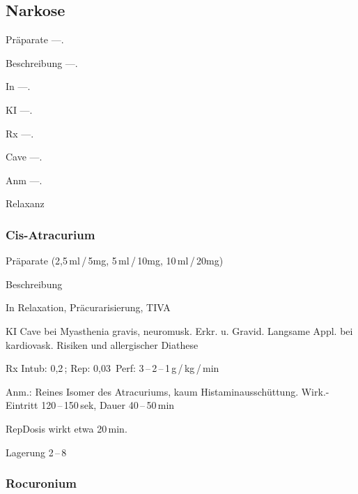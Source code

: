 \subsection{Narkose}

\begin{labeling}[:]{mm}
  \item[Präparate] ---.
  \item[Beschreibung] ---.
  \item[In] ---.
  \item[KI] ---.
  \item[Rx] ---.
  \item[Cave] ---.
  \item[Anm] ---.
\end{labeling}

Relaxanz


\subsubsection{Cis-Atracurium}

\begin{labeling}[:]{mm}
  \item[Präparate] (2,5\,ml\,/\,5mg, 5\,ml\,/\,10mg, 10\,ml\,/\,20mg)
  \item[Beschreibung] 
  \item[In] Relaxation, Präcurarisierung, TIVA
  \item[KI] Cave bei Myasthenia gravis, neuromusk. Erkr. u.
Gravid.\newline
Langsame Appl. bei kardiovask. Risiken und allergischer Diathese
\item[Rx] Intub: 0,2\,; Rep: 0,03\,\newline
Perf: 3\,--\,2\,--\,1\,{\textmu}g\,/\,kg\,/\,min
\item[Anm.:]Reines Isomer des Atracuriums, kaum Histaminausschüttung.
Wirk.-Eintritt 120\,--\,150\,sek, Dauer 40\,--\,50\,min

RepDosis wirkt etwa 20\,min.

Lagerung 2\,--\,8{\textcelsius}
\end{labeling}



\subsubsection{Rocuronium}


